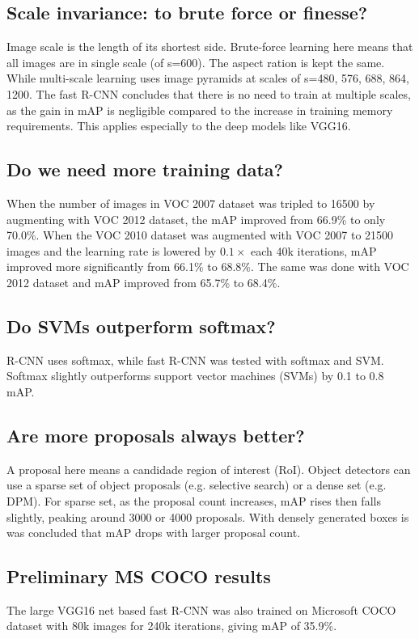 \documentclass[10pt]{article}
\begin{document}
\subsection{Scale invariance: to brute force or finesse?}
Image scale is the length of its shortest side. Brute-force learning here means that all images are in single scale (of s=600). The aspect ration is kept the same. While multi-scale learning uses image pyramids at scales of s={480, 576, 688, 864, 1200}. The fast R-CNN concludes that there is no need to train at multiple scales, as the gain in mAP is negligible compared to the increase in training memory requirements. This applies especially to the deep models like VGG16.

\subsection{Do we need more training data?}
When the number of images in VOC 2007 dataset was tripled to 16500 by augmenting with VOC 2012 dataset, the mAP improved from 66.9\% to only 70.0\%. When the VOC 2010 dataset was augmented with VOC 2007 to 21500 images and the learning rate is lowered by $0.1\times$ each 40k iterations, mAP improved more significantly from 66.1\% to 68.8\%. The same was done with VOC 2012 dataset and mAP improved from 65.7\% to 68.4\%.

\subsection{Do SVMs outperform softmax?}
R-CNN uses softmax, while fast R-CNN was tested with softmax and SVM. Softmax slightly outperforms support vector machines (SVMs) by 0.1 to 0.8 mAP.

\subsection{Are more proposals always better?}
A proposal here means a candidade region of interest (RoI). Object detectors can use a sparse set of object proposals (e.g. selective search) or a dense set (e.g. DPM). For sparse set, as the proposal count increases, mAP rises then falls slightly, peaking around 3000 or 4000 proposals. With densely generated boxes is was concluded that mAP drops with larger proposal count.

\subsection{Preliminary MS COCO results}
The large VGG16 net based fast R-CNN was also trained on Microsoft COCO dataset with 80k images for 240k iterations, giving mAP of 35.9\%.
\end{document}
